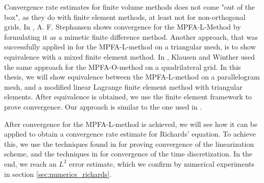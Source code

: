 \documentclass[../Main/main.tex]{subfiles}
\begin{document}
\par 
Convergence rate estimates for finite volume methods does not come "out of the box", as they do with finite element methods, at least not for non-orthogonal grids. In \cite{Stephansen2012ConvergenceOT}, A. F. Stephansen shows convergence for the MPFA-L-Method by formulating it as a mimetic finite difference method. Another approach, that was successfully applied in \cite{https://doi.org/10.1002/fld.1787} for the MPFA-L-method on a triangular mesh, is to show equivalence with a mixed finite element method. In \cite{klausen2006robust}, Klausen and Winther used the same approach for the MPFA-O-method on a quadrilateral grid. In this thesis, we will show equivalence between the MPFA-L-method on a parallelogram mesh, and a modified linear Lagrange finite element method with triangular elements. After equivalence is obtained, we use the finite element framework to prove convergence. Our approach is similar to the one used in \cite{https://doi.org/10.1002/num.20525}. 
\par
After convergence for the MPFA-L-method is achieved, we will see how it can be applied to obtain a convergence rate estimate for Richards' equation. To achieve this, we use the techniques found in \cite{list2016study} for proving convergence of the linearization scheme, and the techniques in \cite{FlorinTimeConvergence,Pop2002} for convergence of the time discretization. In the end, we reach an $L^2$ error estimate, which we confirm by numerical experiments in section \ref{sec:numerics_richards}.
\end{document}
